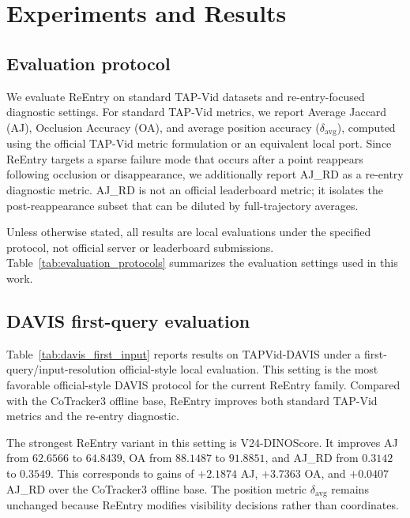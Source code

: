 
\section{Experiments and Results}
\label{sec:experiments}

\subsection{Evaluation protocol}
\label{sec:evaluation_protocol}

We evaluate ReEntry on standard TAP-Vid datasets and re-entry-focused diagnostic settings. For standard TAP-Vid metrics, we report Average Jaccard (AJ), Occlusion Accuracy (OA), and average position accuracy ($\delta_{\mathrm{avg}}$), computed using the official TAP-Vid metric formulation or an equivalent local port. Since ReEntry targets a sparse failure mode that occurs after a point reappears following occlusion or disappearance, we additionally report AJ\_RD as a re-entry diagnostic metric. AJ\_RD is not an official leaderboard metric; it isolates the post-reappearance subset that can be diluted by full-trajectory averages.

Unless otherwise stated, all results are local evaluations under the specified protocol, not official server or leaderboard submissions. Table~\ref{tab:evaluation_protocols} summarizes the evaluation settings used in this work.

\subsection{DAVIS first-query evaluation}
\label{sec:davis_first_input}

Table~\ref{tab:davis_first_input} reports results on TAPVid-DAVIS under a first-query/input-resolution official-style local evaluation. This setting is the most favorable official-style DAVIS protocol for the current ReEntry family. Compared with the CoTracker3 offline base, ReEntry improves both standard TAP-Vid metrics and the re-entry diagnostic.

The strongest ReEntry variant in this setting is V24-DINOScore. It improves AJ from $62.6566$ to $64.8439$, OA from $88.1487$ to $91.8851$, and AJ\_RD from $0.3142$ to $0.3549$. This corresponds to gains of $+2.1874$ AJ, $+3.7363$ OA, and $+0.0407$ AJ\_RD over the CoTracker3 offline base. The position metric $\delta_{\mathrm{avg}}$ remains unchanged because ReEntry modifies visibility decisions rather than coordinates.

